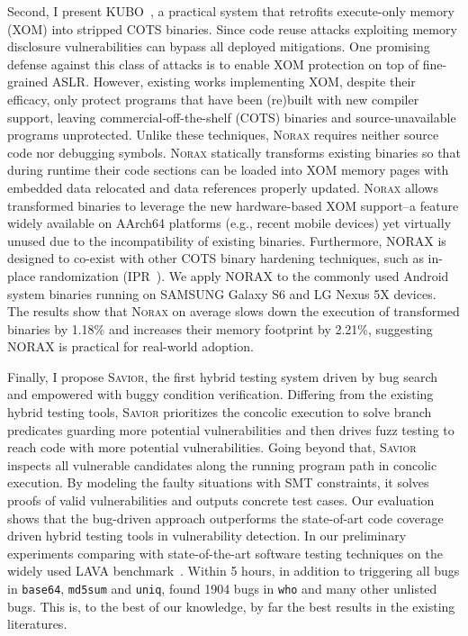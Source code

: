 Second, I present \textsc{KUBO}~\cite{kubo}, a practical system that retrofits execute-only memory (XOM) into stripped COTS binaries. Since code reuse attacks exploiting memory disclosure vulnerabilities can bypass all deployed mitigations. One promising defense against this class of attacks is to enable XOM protection on top of fine-grained ASLR. However, existing works implementing XOM, despite their efficacy, only protect programs that have been (re)built with new compiler support, leaving commercial-off-the-shelf (COTS) binaries and source-unavailable programs unprotected.  Unlike these techniques, \textsc {Norax} requires neither source code nor debugging symbols. \textsc {Norax} statically transforms existing binaries so that during runtime their code sections can be loaded into XOM memory pages with embedded data relocated and data references properly updated. \textsc {Norax} allows transformed binaries to leverage the new hardware-based XOM support--a feature widely available on AArch64 platforms (e.g., recent mobile devices) yet virtually unused due to the incompatibility of existing binaries. Furthermore, NORAX is designed to co-exist with other COTS binary hardening techniques, such as in-place randomization (IPR~\cite{ipr}). We apply NORAX to the commonly used Android system binaries running on SAMSUNG Galaxy S6 and LG Nexus 5X devices. The results show that \textsc {Norax} on average slows down the execution of transformed binaries by 1.18\% and increases their memory footprint by 2.21\%, suggesting NORAX is practical for real-world adoption.

Finally, I propose \textsc {Savior}, the first hybrid testing system driven by bug search and empowered with buggy condition verification. Differing from the
existing hybrid testing tools, \textsc {Savior} prioritizes the concolic execution to solve branch predicates guarding more potential 
vulnerabilities and then drives fuzz testing to reach code with more potential vulnerabilities. Going beyond that, \textsc {Savior} inspects all vulnerable 
candidates along the running program path in concolic execution. By modeling the faulty situations with SMT constraints, it solves proofs 
of valid vulnerabilities and outputs concrete test cases. Our evaluation shows that the bug-driven approach outperforms the state-of-art 
code coverage driven hybrid testing tools in vulnerability detection. In our preliminary experiments comparing \savior with state-of-the-art software testing techniques on the widely used LAVA benchmark~\cite{lava}. Within 5 hours, in addition to triggering all bugs in {\tt base64}, {\tt md5sum} and {\tt uniq}, \savior found 1904 bugs in {\tt who} and many other unlisted bugs. This is, to the best of our knowledge, by far the best results in the existing literatures.


